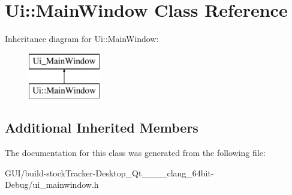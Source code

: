 \hypertarget{class_ui_1_1_main_window}{}\section{Ui\+:\+:Main\+Window Class Reference}
\label{class_ui_1_1_main_window}
Inheritance diagram for Ui\+:\+:Main\+Window\+:\begin{figure}[H]
\begin{center}
\leavevmode
\includegraphics[height=2.000000cm]{class_ui_1_1_main_window}
\end{center}
\end{figure}
\subsection*{Additional Inherited Members}


The documentation for this class was generated from the following file\+:\begin{DoxyCompactItemize}
\item 
G\+U\+I/build-\/stock\+Tracker-\/\+Desktop\+\_\+\+Qt\+\_\+\_\+\_\+\_\+clang\+\_\+64bit-\/\+Debug/ui\+\_\+mainwindow.\+h\end{DoxyCompactItemize}

